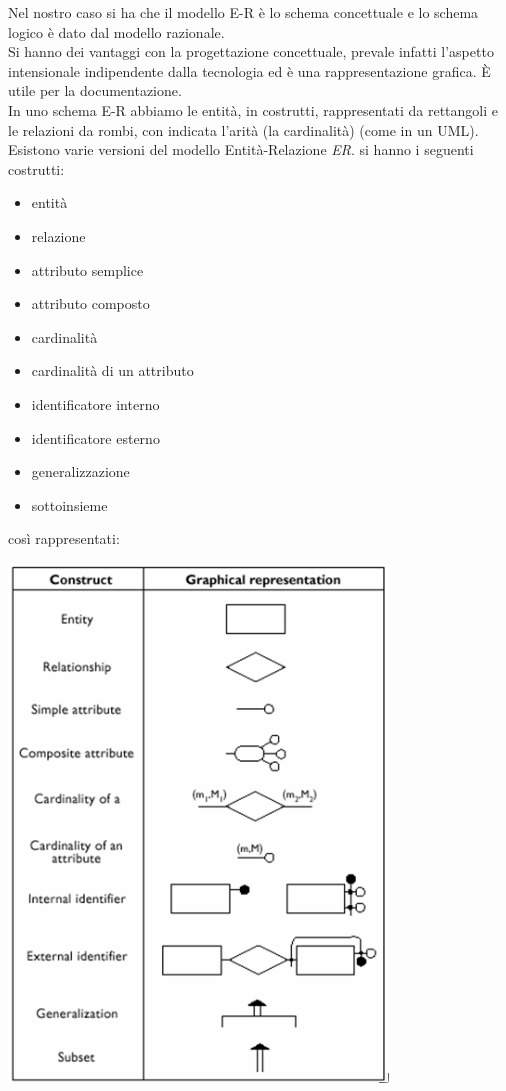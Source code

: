\documentclass[a4paper,12pt, oneside]{book}
\begin{document}
Nel nostro caso si ha che il modello E-R è lo schema concettuale e lo schema logico è dato dal modello razionale.\\
Si hanno dei vantaggi con la progettazione concettuale, prevale infatti l'aspetto intensionale indipendente dalla tecnologia ed è una rappresentazione grafica. È utile per la documentazione.\\
In uno schema E-R abbiamo le entità, in costrutti,  rappresentati da rettangoli e le relazioni da rombi, con indicata l'arità (la cardinalità) (come in un UML). Esistono varie versioni del modello Entità-Relazione \textit{ER}.
si hanno i seguenti costrutti:
\begin{itemize}
\item entità
\item relazione
\item attributo semplice
\item attributo composto
\item cardinalità
\item cardinalità di un attributo
\item identificatore interno
\item identificatore esterno
\item generalizzazione
\item sottoinsieme
\end{itemize}
così rappresentati:
\begin{center}
\includegraphics[scale=0.8]{img/bas6.png}
\end{center}
\end{document}
